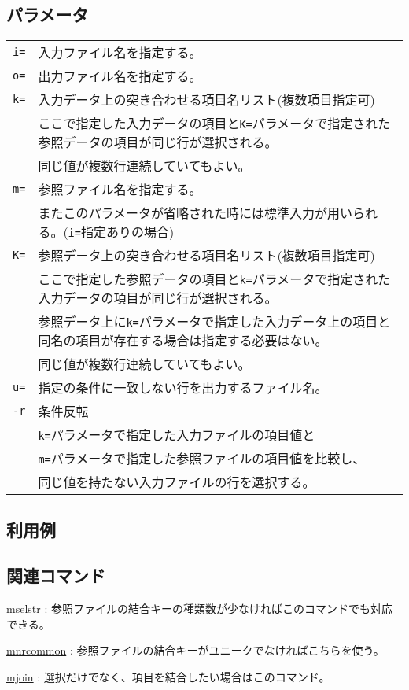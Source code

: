 \subsection*{パラメータ}
\begin{table}[htbp]
{\small
\begin{tabular}{ll}
\verb|i=|    & 入力ファイル名を指定する。\\
\verb|o=|    & 出力ファイル名を指定する。\\
\verb|k=|    & 入力データ上の突き合わせる項目名リスト(複数項目指定可)\\
             & ここで指定した入力データの項目と\verb|K=|パラメータで指定された参照データの項目が同じ行が選択される。\\
             & 同じ値が複数行連続していてもよい。\\
\verb|m=|    & 参照ファイル名を指定する。\\
             & またこのパラメータが省略された時には標準入力が用いられる。(\verb|i=|指定ありの場合)\\
\verb|K=|    & 参照データ上の突き合わせる項目名リスト(複数項目指定可)\\
             & ここで指定した参照データの項目と\verb|k=|パラメータで指定された入力データの項目が同じ行が選択される。\\
             & 参照データ上に\verb|k=|パラメータで指定した入力データ上の項目と同名の項目が存在する場合は指定する必要はない。\\
             & 同じ値が複数行連続していてもよい。\\
\verb|u=|    & 指定の条件に一致しない行を出力するファイル名。\\
\verb|-r|    & 条件反転\\
             & \verb|k=|パラメータで指定した入力ファイルの項目値と\\
             & \verb|m=|パラメータで指定した参照ファイルの項目値を比較し、\\
             & 同じ値を持たない入力ファイルの行を選択する。 
\end{tabular} 
}
\end{table} 

\subsection*{利用例}

\subsection*{関連コマンド}

\hyperref[sect:mselstr]{mselstr} : 参照ファイルの結合キーの種類数が少なければこのコマンドでも対応できる。

\hyperref[sect:mnrcommon]{mnrcommon} : 参照ファイルの結合キーがユニークでなければこちらを使う。

\hyperref[sect:mjoin]{mjoin} : 選択だけでなく、項目を結合したい場合はこのコマンド。

%
